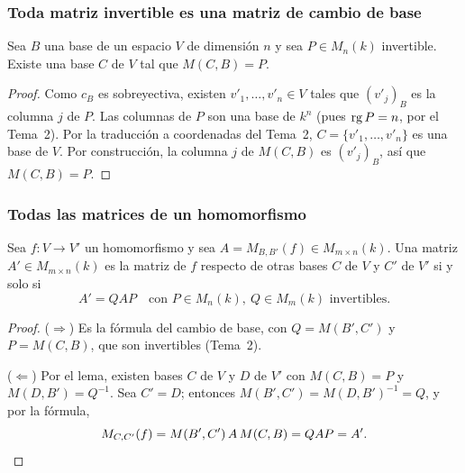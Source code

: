 \begin{frame}
    \frametitle{Toda matriz invertible es una matriz de cambio de base}

    \begin{lemma}
        Sea $B$ una base de un espacio $V$ de dimensión $n$ y sea
        $P\in M_n(k)$ invertible. Existe una base $C$ de $V$ tal que
        $M(C,B)=P$.
    \end{lemma}

    \begin{proof}
        Como $c_B$ es sobreyectiva, existen $v'_1,\ldots,v'_n\in V$ tales
        que $(v'_j)_B$ es la columna $j$ de $P$. Las columnas de $P$ son
        una base de $k^n$ (pues $\operatorname{rg} P=n$, por el Tema~2). Por la
        traducción a coordenadas del Tema~2, $C=\{v'_1,\ldots,v'_n\}$ es
        una base de $V$. Por construcción, la columna $j$ de $M(C,B)$ es
        $(v'_j)_B$, así que $M(C,B)=P$.
    \end{proof}
\end{frame}


\begin{frame}
    \frametitle{Todas las matrices de un homomorfismo}

    \begin{theorem}
        Sea $f\colon V\to V'$ un homomorfismo y sea
        $A=M_{B,B'}(f)\in M_{m\times n}(k)$. Una matriz
        $A'\in M_{m\times n}(k)$ es la matriz de $f$ respecto de otras
        bases $C$ de $V$ y $C'$ de $V'$ si y solo si
        \[
            A'=QAP\quad\text{con }P\in M_n(k),\ Q\in M_m(k)\text{ invertibles.}
        \]
    \end{theorem}

    \begin{proof}
        ($\Rightarrow$) Es la fórmula del cambio de base, con
        $Q=M(B',C')$ y $P=M(C,B)$, que son invertibles (Tema~2).

        ($\Leftarrow$) Por el lema, existen bases $C$ de $V$ y $D$ de $V'$
        con $M(C,B)=P$ y $M(D,B')=Q^{-1}$. Sea $C'=D$; entonces
        $M(B',C')=M(D,B')^{-1}=Q$, y por la fórmula,
        \[
            M_{C,C'}(f)=M(B',C')\,A\,M(C,B)=QAP=A'.\qedhere
        \]
    \end{proof}
\end{frame}


